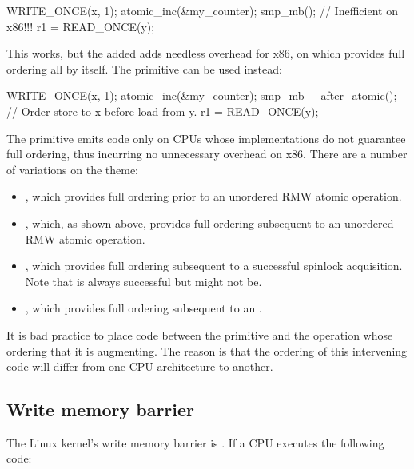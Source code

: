\begin{VerbatimU}
	WRITE_ONCE(x, 1);
	atomic_inc(&my_counter);
	smp_mb(); // Inefficient on x86!!!
	r1 = READ_ONCE(y);
\end{VerbatimU}

This works, but the added  adds needless overhead for
x86, on which  provides full ordering all by itself.
The  primitive can be used instead:

\begin{VerbatimU}
	WRITE_ONCE(x, 1);
	atomic_inc(&my_counter);
	smp_mb__after_atomic(); // Order store to x before load from y.
	r1 = READ_ONCE(y);
\end{VerbatimU}

The  primitive emits code only on CPUs whose
 implementations do not guarantee full ordering, thus
incurring no unnecessary overhead on x86.
There are a number of variations on the  theme:

\begin{itemize}
 \item	{}, which provides full ordering prior
	to an unordered RMW atomic operation.

 \item	{}, which, as shown above, provides full
	ordering subsequent to an unordered RMW atomic operation.

 \item	{}, which provides full ordering subsequent
	to a successful spinlock acquisition.
	Note that  is always successful but 
	might not be.

 \item	{}, which provides full ordering
	subsequent to an .
\end{itemize}

It is bad practice to place code between the  primitive and the
operation whose ordering that it is augmenting.
The reason is that the ordering of this intervening code will differ from
one CPU architecture to another.


\subsection{Write memory barrier}

The Linux kernel's write memory barrier is .
If a CPU executes the following code:

